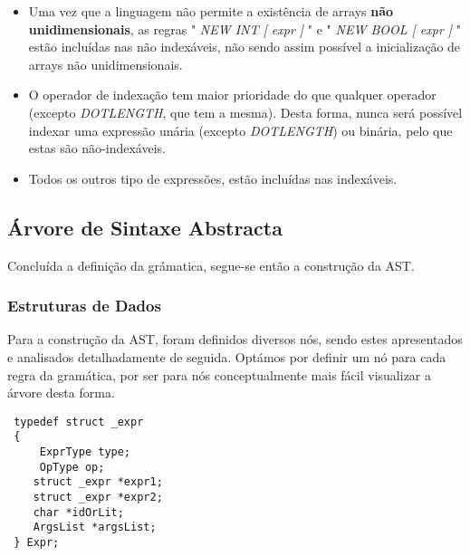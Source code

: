 \documentclass[11pt,a4paper]{article}
\begin{document}
\begin{itemize}
	\item Uma vez que a linguagem não permite a existência de arrays \textbf{não unidimensionais}, as regras " \textit{NEW INT [ expr ]} " e " \textit{NEW BOOL [ expr ]} " estão incluídas nas não indexáveis, não sendo assim possível a inicialização de arrays não unidimensionais.
	
	\item O operador de indexação tem maior prioridade do que qualquer operador (excepto \textit{DOTLENGTH}, que tem a mesma). Desta forma, nunca será possível indexar uma expressão unária (excepto \textit{DOTLENGTH}) ou binária, pelo que estas são não-indexáveis. 
	
	\item Todos os outros tipo de expressões, estão incluídas nas indexáveis.
\end{itemize}

\subsection{Árvore de Sintaxe Abstracta}

Concluída a definição da grámatica, segue-se então a construção da AST.

\subsubsection{Estruturas de Dados}

Para a construção da AST, foram definidos diversos nós, sendo estes apresentados e analisados detalhadamente de seguida. Optámos por definir um nó para cada regra da gramática, por ser para nós conceptualmente mais fácil visualizar a árvore desta forma.

\begin{lstlisting}
 typedef struct _expr
 {
     ExprType type;
     OpType op;
 	struct _expr *expr1;
 	struct _expr *expr2;
 	char *idOrLit;
 	ArgsList *argsList;
 } Expr;
\end{lstlisting}

\vspace{0.3cm}
\end{document}
